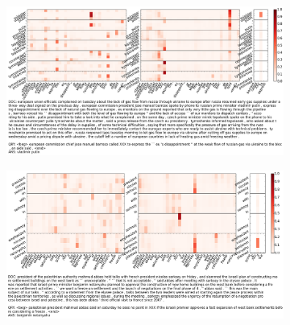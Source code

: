 \documentclass[11pt,a4paper]{article}
\begin{document}
\begin{figure}
\centering
\caption{\small Layer-wise attention visualization of GA Reader trained on WDW-Strict. See text for details.}
\begin{subfigure}[b]{\textwidth}
\centering
\includegraphics[width=\linewidth]{attention_plots/AFP_ENG_20090113_0407_question.png}
\end{subfigure}
\begin{subfigure}[b]{\textwidth}
\centering
\includegraphics[width=\linewidth]{attention_plots/AFP_ENG_20090905_0240_question.png}
\end{subfigure}
\end{figure}
\end{document}
